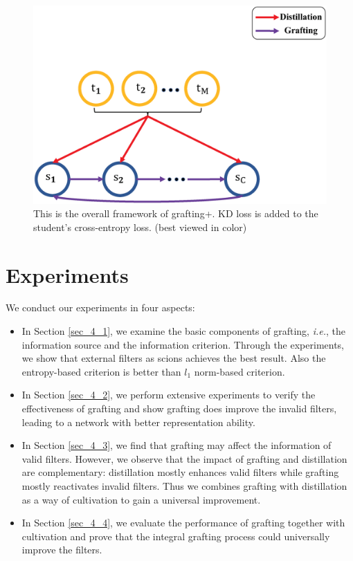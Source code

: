 \documentclass{article}
\begin{document}
\begin{figure}[!t]
	\centering
	\includegraphics[width=15cm,]{fig/grafting+distillation_3.eps}
	\caption{This is the overall framework of grafting+. KD loss is added to the student's cross-entropy loss. (best viewed in color)}
	\label{figure: grafting+}
\end{figure}


\section{Experiments}
\label{sec:exp}


We conduct our experiments in four aspects:
\begin{itemize}
	\item In Section \ref{sec_4_1}, we examine the basic components of grafting, \emph{i.e.}, the information source and the information criterion. Through the experiments, we show that external filters as scions achieves the best result. Also the entropy-based criterion is better than $l_{1}$ norm-based criterion. 
	\item In Section \ref{sec_4_2}, we perform extensive experiments to verify the effectiveness of grafting and show grafting does improve the invalid filters, leading to a network with better representation ability.
	\item In Section \ref{sec_4_3}, we find that grafting may affect the information of valid filters. However, we observe that the impact of grafting and distillation are complementary: distillation mostly enhances valid filters while grafting mostly reactivates invalid filters. Thus we combines grafting with distillation as a way of cultivation to gain a universal improvement.
	\item In Section \ref{sec_4_4}, we evaluate the performance of grafting together with cultivation and prove that the integral grafting process could universally improve the filters. 
\end{itemize}
\end{document}
